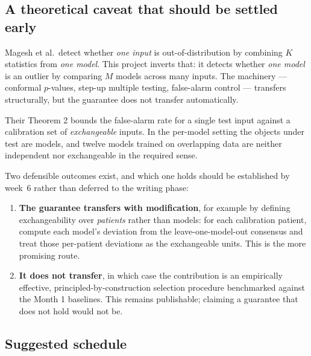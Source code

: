 \documentclass[11pt,a4paper]{article}
\begin{document}
\subsection{A theoretical caveat that should be settled early}

Magesh et al.\ detect whether \emph{one input} is out-of-distribution by
combining $K$ statistics from \emph{one model}. This project inverts that: it
detects whether \emph{one model} is an outlier by comparing $M$ models across
many inputs. The machinery --- conformal $p$-values, step-up multiple testing,
false-alarm control --- transfers structurally, but the guarantee does not
transfer automatically.

Their Theorem 2 bounds the false-alarm rate for a single test input against a
calibration set of \emph{exchangeable} inputs. In the per-model setting the
objects under test are models, and twelve models trained on overlapping data are
neither independent nor exchangeable in the required sense.

Two defensible outcomes exist, and which one holds should be established by
week~6 rather than deferred to the writing phase:

\begin{enumerate}
  \item \textbf{The guarantee transfers with modification}, for example by
        defining exchangeability over \emph{patients} rather than models: for
        each calibration patient, compute each model's deviation from the
        leave-one-model-out consensus and treat those per-patient deviations as
        the exchangeable units. This is the more promising route.
  \item \textbf{It does not transfer}, in which case the contribution is an
        empirically effective, principled-by-construction selection procedure
        benchmarked against the Month 1 baselines. This remains publishable;
        claiming a guarantee that does not hold would not be.
\end{enumerate}

\subsection{Suggested schedule}
\end{document}
